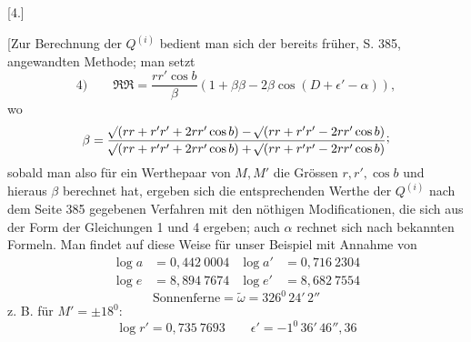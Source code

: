 \clearpage
\par\bigskip{}
\begin{center}[4.]\end{center}
\begingroup\small
\noindent\hspace*{\parindent}[Zur Berechnung der \(Q^{(i)}\) bedient man sich der bereits früher, S. 385, angewandten Methode; man setzt
\[
4)\qquad \mathfrak{R}\mathfrak{R}=\frac{rr'\cos b}{\beta}(1+\beta\beta-2\beta\cos(D+\epsilon'-\alpha)),
\]
wo
\[
\beta=\frac{\BareRoot{(rr+r'r'+2rr'\cos b)}-\BareRoot{(rr+r'r'-2rr'\cos b)}}{\BareRoot{(rr+r'r'+2rr'\cos b)}+\BareRoot{(rr+r'r'-2rr'\cos b)}}\mathpunct{\raisebox{.45ex}{;}}
\]
sobald man also für ein Werthepaar von \(M,M'\) die Grössen \(r,r',\cos b\) und hieraus \(\beta\) berechnet hat, ergeben sich die entsprechenden Werthe der \(Q^{(i)}\) nach dem Seite 385 gegebenen Verfahren mit den nöthigen Modificationen, die sich aus der Form der Gleichungen 1 und 4 ergeben; auch \(\alpha\) rechnet sich nach bekannten Formeln. Man findet auf diese Weise für unser Beispiel mit Annahme von
\[
\begin{aligned}
\log a&=0{,}442\ 0004&\log a'&=0{,}716\ 2304\\
\log e&=8{,}894\ 7674&\log e'&=8{,}682\ 7554
\end{aligned}
\]
\[
\text{Sonnenferne}=\tilde\omega=326^{0}\,24'\,2''
\]
z. B. für \(M'=\pm18^{0}\):
\[
\log r'=0{,}735\ 7693\qquad \epsilon'=-1^{0}\,36'\,46''{,}36
\]
\begingroup\footnotesize\setlength{\arraycolsep}{2pt}
